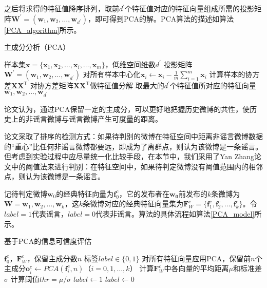 \documentclass[a4paper,oneside,12pt]{book}
\begin{document}
之后将求得的特征值降序排列，取前$d^\prime$个特征值对应的特征向量组成所需的投影矩阵$\bm{W}^\prime =(\bm{w}_1,\bm{w}_2,\ldots,\bm{w}_{d^\prime})$，即可得到PCA的解。PCA算法的描述如算法\ref{PCA_algorithm}所示。
\begin{algorithm} 
\caption{主成分分析（PCA）} 
\label{PCA_algorithm}
\renewcommand{\algorithmicrequire}{\textbf{输入：}}
\renewcommand{\algorithmicensure}{\textbf{输出：}} 
\begin{algorithmic}[1] 
\Require 样本集$\bm{x}=\{\bm{x}_1,\bm{x}_2,\ldots,\bm{x}_i,\ldots,\bm{x}_m\}$，低维空间维数$d^\prime$ 
\Ensure 投影矩阵  $\bm{W}^\prime =(\bm{w}_1,\bm{w}_2,\ldots,\bm{w}_{d^\prime})$
\State 对所有样本中心化$\bm{x}_i \gets \bm{x}_i - \frac{1}{m}\sum_{i=1}^m \bm{x}_i$
\State  计算样本的协方差$\bm{X}\bm{X}^ \mathrm{T}$
\State 对协方差矩阵$\bm{X}\bm{X}^ \mathrm{T}$做特征值分解
\State 取最大的$d^\prime$个特征值所对应的特征向量$\bm{w}_1,\bm{w}_2,\ldots,\bm{w}_{d^\prime}$
\end{algorithmic}  
\end{algorithm}

论文\cite{Chen2016Behavior}认为，通过PCA保留一定的主成分，可以更好地把握历史微博的共性，使历史上的非谣言微博与谣言微博产生可度量的距离。

论文采取了排序的检测方式：如果待判别的微博在特征空间中距离非谣言微博数据的“重心”比任何非谣言微博都要远，即成为了离群点，则认为该微博是一条谣言。但考虑到实验过程中应尽量统一化比较手段，在本节中，我们采用了Yan Zhang论文\cite{Yan2017OneHot}中的阈值法来进行判别：在特征空间中，如果待判定微博没有阈值范围内的相邻点，则认为该微博是一条谣言。

记待判定微博$\bm{w}_0$的经典特征向量为$\bm{f}^{c}_{0}$，它的发布者在$\bm{w_0}$前发布的$k$条微博为$\bm{W} = \bm{w}_1,\bm{w}_2,\ldots,\bm{w}_k$，这$k$条微博对应的经典特征向量集为$\bm{F}^{c}_{W} = \{ \bm{f}^{c}_{1},\bm{f}^{c}_{2},\ldots,\bm{f}^{c}_{k} \}$。令$label = 1$代表谣言，$label = 0$代表非谣言。算法的具体流程如算法\ref{PCA_model}所示。

\begin{algorithm} 
\caption{基于PCA的信息可信度评估} 
\label{PCA_model}
\renewcommand{\algorithmicrequire}{\textbf{输入：}}
\renewcommand{\algorithmicensure}{\textbf{输出：}} 
	\begin{algorithmic}[1] 
	\Require $\bm{f}^{c}_{0}$，$\bm{F}^{c}_{W}$，保留主成分数$n$
	\Ensure 标签$label\in \{0,1\}$
	\State 对所有特征向量应用PCA，保留前$n$个主成分$\bm{o}^{c}_{i} \gets PCA(\bm{f}^{c}_{i}, n)$（$i = 0,1,\ldots,k$）
	\State 计算$\bm{F}^{c}_{W}$中各向量的平均距离$\mu$和标准差$\sigma$
	\State 计算阈值$thr = {\mu} / {\sigma}$
		\State $ label \gets 1 $
	\Else
		\State $ label \gets 0 $
	\EndIf
	\end{algorithmic}
\end{algorithm}
\end{document}
